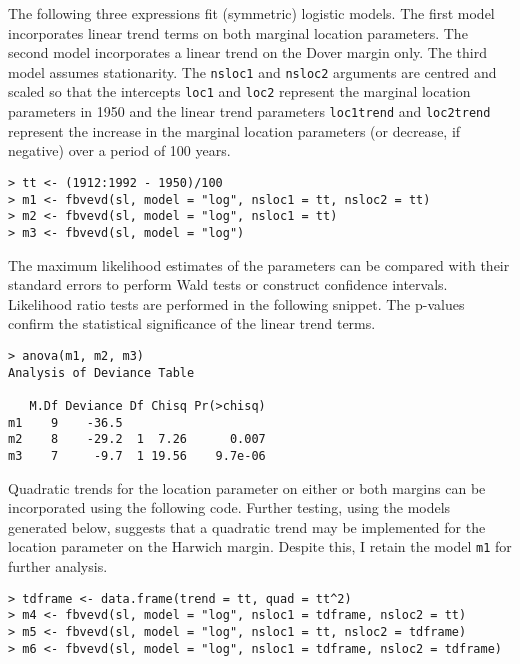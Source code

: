 \documentclass[11pt,a4paper]{article}
\begin{document}
The following three expressions fit (symmetric) logistic models. 
The first model incorporates linear trend terms on both marginal location parameters.
The second model incorporates a linear trend on the Dover margin only.
The third model assumes stationarity. 
 The \verb+nsloc1+ and \verb+nsloc2+ arguments are centred and scaled so that the intercepts \verb+loc1+ and \verb+loc2+ represent the marginal location parameters in 1950 and the linear trend parameters \verb+loc1trend+ and \verb+loc2trend+ represent the increase in the marginal location parameters (or decrease, if negative) over a period of 100 years.

\begin{verbatim}
> tt <- (1912:1992 - 1950)/100
> m1 <- fbvevd(sl, model = "log", nsloc1 = tt, nsloc2 = tt)
> m2 <- fbvevd(sl, model = "log", nsloc1 = tt)
> m3 <- fbvevd(sl, model = "log")
\end{verbatim}


The maximum likelihood estimates of the parameters can be compared with their standard errors to perform Wald tests or construct confidence intervals.
Likelihood ratio tests are performed in the following snippet. 
The p-values confirm the statistical significance of the linear trend terms.

\begin{verbatim}
> anova(m1, m2, m3)
Analysis of Deviance Table

   M.Df Deviance Df Chisq Pr(>chisq)
m1    9    -36.5
m2    8    -29.2  1  7.26      0.007 
m3    7     -9.7  1 19.56    9.7e-06 
\end{verbatim}

Quadratic trends for the location parameter on either or both margins can be incorporated using the following code.
Further testing, using the models generated below, suggests that a quadratic trend may be implemented for the location parameter on the Harwich margin.
Despite this, I retain the model \verb+m1+ for further analysis. 

\begin{verbatim}
> tdframe <- data.frame(trend = tt, quad = tt^2)
> m4 <- fbvevd(sl, model = "log", nsloc1 = tdframe, nsloc2 = tt)
> m5 <- fbvevd(sl, model = "log", nsloc1 = tt, nsloc2 = tdframe)
> m6 <- fbvevd(sl, model = "log", nsloc1 = tdframe, nsloc2 = tdframe)
\end{verbatim}
\end{document}
